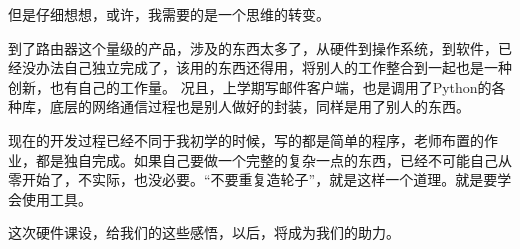\documentclass{itecreport-zh}
\begin{document}
但是仔细想想，或许，我需要的是一个思维的转变。


到了路由器这个量级的产品，涉及的东西太多了，从硬件到操作系统，到软件，已经没办法自己独立完成了，该用的东西还得用，将别人的工作整合到一起也是一种创新，也有自己的工作量。
况且，上学期写邮件客户端，也是调用了Python的各种库，底层的网络通信过程也是别人做好的封装，同样是用了别人的东西。


现在的开发过程已经不同于我初学的时候，写的都是简单的程序，老师布置的作业，都是独自完成。如果自己要做一个完整的复杂一点的东西，已经不可能自己从零开始了，不实际，也没必要。“不要重复造轮子”，就是这样一个道理。就是要学会使用工具。


这次硬件课设，给我们的这些感悟，以后，将成为我们的助力。
\end{document}
